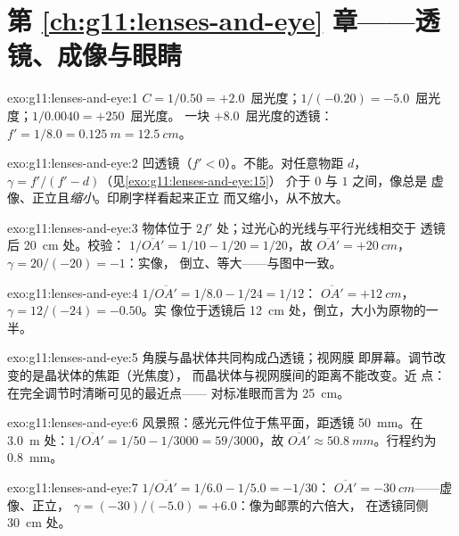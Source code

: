 \section*{第 \ref{ch:g11:lenses-and-eye} 章——透镜、成像与眼睛}

\begin{solution}{exo:g11:lenses-and-eye:1}
$C = 1/0.50 = +2.0$~屈光度；$1/(-0.20) = -5.0$~屈光度；$1/0.0040 = +250$~屈光度。
一块 $+8.0$~屈光度的透镜：$f' = 1/8.0 = \qty{0.125}{m} = \qty{12.5}{cm}$。
\end{solution}

\begin{solution}{exo:g11:lenses-and-eye:2}
凹透镜（$f' < 0$）。不能。对任意物距 $d$，
$\gamma = f'/(f' - d)$（见\cref{exo:g11:lenses-and-eye:15}）
介于 $0$ 与 $1$ 之间，像总是
虚像、正立且\emph{缩小}。印刷字样看起来正立
而又缩小，从不放大。
\end{solution}

\begin{solution}{exo:g11:lenses-and-eye:3}
物体位于 $2f'$ 处；过光心的光线与平行光线相交于
透镜后 \qty{20}{cm} 处。校验：
$1/\overline{OA'} = 1/10 - 1/20 = 1/20$，故
$\overline{OA'} = +\qty{20}{cm}$，$\gamma = 20/(-20) = -1$：实像，
倒立、等大——与图中一致。
\end{solution}

\begin{solution}{exo:g11:lenses-and-eye:4}
$1/\overline{OA'} = 1/8.0 - 1/24 = 1/12$：
$\overline{OA'} = +\qty{12}{cm}$，$\gamma = 12/(-24) = -0.50$。实
像位于透镜后 \qty{12}{cm} 处，倒立，大小为原物的一半。
\end{solution}

\begin{solution}{exo:g11:lenses-and-eye:5}
角膜与晶状体共同构成凸透镜；视网膜
即屏幕。调节改变的是晶状体的焦距（光焦度），
而晶状体与视网膜间的距离不能改变。近
点：在完全调节时清晰可见的最近点——
对标准眼而言为 \qty{25}{cm}。
\end{solution}

\begin{solution}{exo:g11:lenses-and-eye:6}
风景照：感光元件位于焦平面，距透镜 \qty{50}{mm}。在
\qty{3.0}{m} 处：$1/\overline{OA'} = 1/50 - 1/3000 = 59/3000$，故
$\overline{OA'} \approx \qty{50.8}{mm}$。行程约为 \qty{0.8}{mm}。
\end{solution}

\begin{solution}{exo:g11:lenses-and-eye:7}
$1/\overline{OA'} = 1/6.0 - 1/5.0 = -1/30$：
$\overline{OA'} = \qty{-30}{cm}$——虚像、正立，
$\gamma = (-30)/(-5.0) = +6.0$：像为邮票的六倍大，
在透镜同侧 \qty{30}{cm} 处。
\end{solution}


